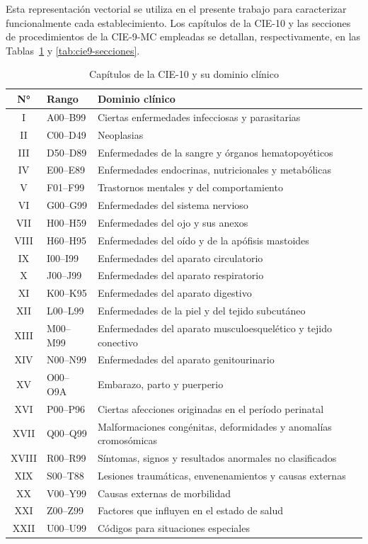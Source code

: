 Esta representación vectorial se utiliza en el presente trabajo para
caracterizar funcionalmente cada establecimiento. Los capítulos de la CIE-10 y
las secciones de procedimientos de la CIE-9-MC empleadas se detallan,
respectivamente, en las Tablas~\ref{tab:cie10-capitulos} y
\ref{tab:cie9-secciones}.

\begin{table}[H]
\centering
\caption{Capítulos de la CIE-10 y su dominio clínico}
\label{tab:cie10-capitulos}
\begin{tabular}{cll}
\hline
\textbf{N°} & \textbf{Rango} & \textbf{Dominio clínico} \\
\hline
I    & A00--B99 & Ciertas enfermedades infecciosas y parasitarias \\
II   & C00--D49 & Neoplasias \\
III  & D50--D89 & Enfermedades de la sangre y órganos hematopoyéticos \\
IV   & E00--E89 & Enfermedades endocrinas, nutricionales y metabólicas \\
V    & F01--F99 & Trastornos mentales y del comportamiento \\
VI   & G00--G99 & Enfermedades del sistema nervioso \\
VII  & H00--H59 & Enfermedades del ojo y sus anexos \\
VIII & H60--H95 & Enfermedades del oído y de la apófisis mastoides \\
IX   & I00--I99 & Enfermedades del aparato circulatorio \\
X    & J00--J99 & Enfermedades del aparato respiratorio \\
XI   & K00--K95 & Enfermedades del aparato digestivo \\
XII  & L00--L99 & Enfermedades de la piel y del tejido subcutáneo \\
XIII & M00--M99 & Enfermedades del aparato musculoesquelético y tejido conectivo \\
XIV  & N00--N99 & Enfermedades del aparato genitourinario \\
XV   & O00--O9A & Embarazo, parto y puerperio \\
XVI  & P00--P96 & Ciertas afecciones originadas en el período perinatal \\
XVII & Q00--Q99 & Malformaciones congénitas, deformidades y anomalías cromosómicas \\
XVIII& R00--R99 & Síntomas, signos y resultados anormales no clasificados \\
XIX  & S00--T88 & Lesiones traumáticas, envenenamientos y causas externas \\
XX   & V00--Y99 & Causas externas de morbilidad \\
XXI  & Z00--Z99 & Factores que influyen en el estado de salud \\
XXII & U00--U99 & Códigos para situaciones especiales \\
\hline
\end{tabular}
\end{table}

